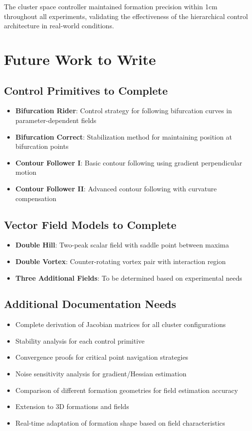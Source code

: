 \documentclass{article}
\begin{document}
The cluster space controller maintained formation precision within 1cm throughout all experiments, validating the effectiveness of the hierarchical control architecture in real-world conditions.

\section{Future Work to Write}

\subsection{Control Primitives to Complete}

\begin{itemize}
\item \textbf{Bifurcation Rider}: Control strategy for following bifurcation curves in parameter-dependent fields
\item \textbf{Bifurcation Correct}: Stabilization method for maintaining position at bifurcation points
\item \textbf{Contour Follower I}: Basic contour following using gradient perpendicular motion
\item \textbf{Contour Follower II}: Advanced contour following with curvature compensation
\end{itemize}

\subsection{Vector Field Models to Complete}

\begin{itemize}
\item \textbf{Double Hill}: Two-peak scalar field with saddle point between maxima
\item \textbf{Double Vortex}: Counter-rotating vortex pair with interaction region
\item \textbf{Three Additional Fields}: To be determined based on experimental needs
\end{itemize}

\subsection{Additional Documentation Needs}

\begin{itemize}
\item Complete derivation of Jacobian matrices for all cluster configurations
\item Stability analysis for each control primitive
\item Convergence proofs for critical point navigation strategies
\item Noise sensitivity analysis for gradient/Hessian estimation
\item Comparison of different formation geometries for field estimation accuracy
\item Extension to 3D formations and fields
\item Real-time adaptation of formation shape based on field characteristics
\end{itemize}
\end{document}
